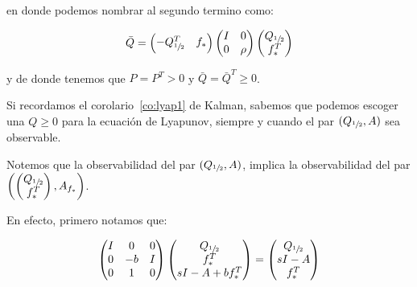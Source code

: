         en donde podemos nombrar al segundo termino como:

        \begin{equation*}
            \bar{Q} =
            \begin{pmatrix}
                -Q_{\sfrac{1}{2}}^T & f_*
            \end{pmatrix}
            \begin{pmatrix}
                I & 0 \\
                0 & \rho
            \end{pmatrix}
            \begin{pmatrix}
                Q_{\sfrac{1}{2}} \\
                f_*^T
            \end{pmatrix}
        \end{equation*}

        y de donde tenemos que $P = P^T > 0$ y $\bar{Q} = \bar{Q}^T \ge 0$.

        Si recordamos el corolario~\ref{co:lyap1} de Kalman, sabemos que podemos escoger una $Q \ge 0$ para la ecuación de Lyapunov, siempre y cuando el par $(Q_{\sfrac{1}{2}}, A)$ sea observable.

        Notemos que la observabilidad del par $(Q_{\sfrac{1}{2}}, A)$, implica la observabilidad del par $\left( \begin{pmatrix} Q_{\sfrac{1}{2}} \\ f_*^T \end{pmatrix} , A_{f_*} \right)$.

        En efecto, primero notamos que:

        \begin{equation}
            \begin{pmatrix}
                I & 0 & 0 \\
                0 & -b & I \\
                0 & 1 & 0
            \end{pmatrix}
            \begin{pmatrix}
                Q_{\sfrac{1}{2}} \\
                f_*^T \\
                sI - A + b f_*^T
            \end{pmatrix} =
            \begin{pmatrix}
                Q_{\sfrac{1}{2}} \\
                sI - A \\
                f_*^T
            \end{pmatrix}
        \end{equation}

